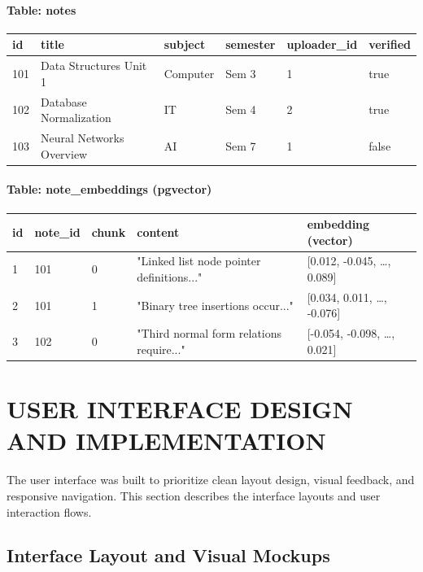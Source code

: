 \documentclass[12,Times new Roman,a4paper]{report}
\begin{document}
\paragraph{Table: notes}
\begin{table}[H]
\centering
\begin{tabular}{|l|l|l|l|l|l|}
\hline
\textbf{id} & \textbf{title} & \textbf{subject} & \textbf{semester} & \textbf{uploader\_id} & \textbf{verified} \\
\hline
101 & Data Structures Unit 1 & Computer & Sem 3 & 1 & true \\
102 & Database Normalization & IT & Sem 4 & 2 & true \\
103 & Neural Networks Overview & AI & Sem 7 & 1 & false \\
\hline
\end{tabular}
\end{table}

\paragraph{Table: note\_embeddings (pgvector)}
\begin{table}[H]
\centering
\begin{tabular}{|l|l|l|p{4.5cm}|l|}
\hline
\textbf{id} & \textbf{note\_id} & \textbf{chunk} & \textbf{content} & \textbf{embedding (vector)} \\
\hline
1 & 101 & 0 & "Linked list node pointer definitions..." & [0.012, -0.045, \dots, 0.089] \\
2 & 101 & 1 & "Binary tree insertions occur..." & [0.034, 0.011, \dots, -0.076] \\
3 & 102 & 0 & "Third normal form relations require..." & [-0.054, -0.098, \dots, 0.021] \\
\hline
\end{tabular}
\end{table}

\newpage
\section{USER INTERFACE DESIGN AND IMPLEMENTATION}

The user interface was built to prioritize clean layout design, visual feedback, and responsive navigation. This section describes the interface layouts and user interaction flows.

\subsection{Interface Layout and Visual Mockups}
\end{document}
